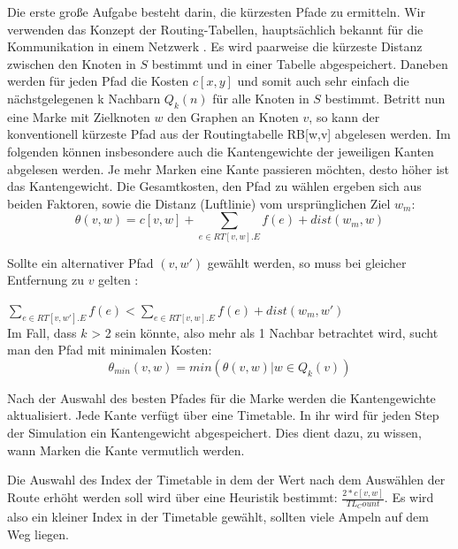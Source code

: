 \documentclass[paper=A4,pagesize=auto,12pt,headinclude=true,footinclude=true,BCOR=0mm,DIV=calc]{scrartcl}
\begin{document}
	Die erste große Aufgabe besteht darin, die kürzesten Pfade zu ermitteln. Wir verwenden das Konzept der Routing-Tabellen, hauptsächlich bekannt für die Kommunikation in einem Netzwerk \cite{RoutingTabelleNetzwerk}. Es wird paarweise die kürzeste Distanz zwischen den Knoten in $S$ bestimmt und in einer Tabelle abgespeichert. Daneben werden für jeden Pfad die Kosten $c[x,y]$ und somit auch sehr einfach die nächstgelegenen k Nachbarn $Q_{k}(n)$ für alle Knoten in $S$ bestimmt.
	Betritt nun eine Marke mit Zielknoten $w$ den Graphen an Knoten $v$, so kann der konventionell kürzeste Pfad aus der Routingtabelle RB[w,v] abgelesen werden. Im folgenden können insbesondere auch die Kantengewichte der jeweiligen Kanten abgelesen werden. Je mehr Marken eine Kante passieren möchten, desto höher ist das Kantengewicht. Die Gesamtkosten, den Pfad zu wählen ergeben sich aus beiden Faktoren, sowie die Distanz (Luftlinie) vom ursprünglichen Ziel $w_{m}$:\\
	
	\begin{equation}
	\theta(v,w)  = c[v,w] + \sum_{e \in RT[v,w].E} f(e) + dist(w_{m}, w)
	\end{equation}

	Sollte ein alternativer Pfad $(v,w')$ gewählt werden, so muss bei gleicher Entfernung zu $v$ gelten :
	
	 $\sum_{e \in RT[v,w'].E} f(e) < \sum_{e \in RT[v,w].E} f(e) + dist(w_{m}, w')$\\
	 
	Im Fall, dass $k$ > 2 sein könnte, also mehr als 1 Nachbar betrachtet wird, sucht man den Pfad mit minimalen Kosten:\\
	
	\begin{equation} 
	\theta_{min}(v,w) = min(\theta(v,w) | w \in Q_{k}(v))
	\end{equation}

	Nach der Auswahl des besten Pfades für die Marke werden die Kantengewichte aktualisiert. Jede Kante verfügt über eine Timetable. In ihr wird für jeden Step der Simulation ein Kantengewicht abgespeichert. Dies dient dazu, zu wissen, wann Marken die Kante vermutlich werden. 
	
	Die Auswahl des Index der Timetable in dem der Wert nach dem Auswählen der Route erhöht werden soll wird über eine Heuristik bestimmt: $\frac{2* c[v,w]}{TL_Count}$. Es wird also ein kleiner Index in der Timetable gewählt, sollten viele Ampeln auf dem Weg liegen.
	
\end{document}
